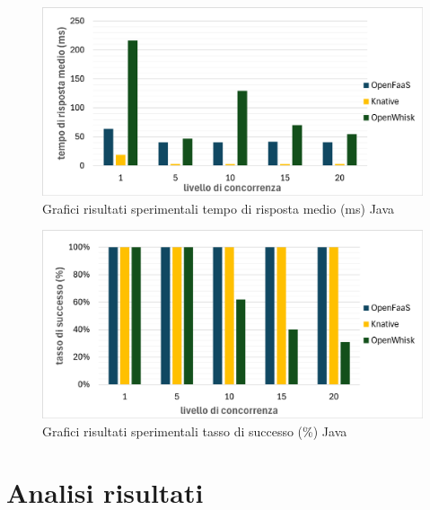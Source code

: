 \documentclass[12pt,a4paper,openany,twoside]{book}
\begin{document}
\begin{figure}[h!]
    \centering
    \includegraphics[width=\linewidth]{figures/graphs/tempoRisposta_java.pdf}
    \caption{Grafici risultati sperimentali tempo di risposta medio (ms) Java}
    \label{fig:grafici-tempo-risposta-java}
\end{figure}
    
\begin{figure}[h!]
    \centering
    \includegraphics[width=\linewidth]{figures/graphs/tassoSuccesso_java.pdf}
    \caption{Grafici risultati sperimentali tasso di successo (\%) Java}
    \label{fig:grafici-tasso-successo-java}
\end{figure}


\section{Analisi risultati}
\end{document}
